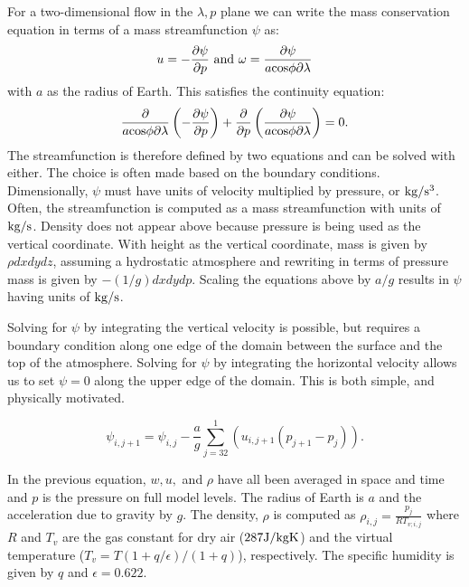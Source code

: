 \documentclass[draft]{agujournal2019}
\begin{document}
For a two-dimensional flow in the $\lambda,p$ plane we can write the mass conservation equation in terms of a 
mass streamfunction $\psi$ as: 
\begin{equation}
u =  -\frac{\partial \psi}{\partial p}   \,\, {\rm and} \,\, \omega =\frac{\partial \psi}{a \rm{cos} \phi \partial \lambda}
\end{equation}
with $a$ as the radius of Earth.
This satisfies the continuity equation: 
\begin{equation}
\frac{\partial}{a \rm{cos} \phi\partial\lambda}\left(-\frac{\partial \psi}{\partial p}\right)+\frac{\partial}{\partial p}\left(\frac{\partial \psi}{a \rm{cos}\phi \partial \lambda}\right)=0.
\end{equation}
The streamfunction is therefore defined by two equations and can be solved with either.  The choice is often made based on the 
boundary conditions.  Dimensionally, $\psi$ must have units of velocity multiplied by pressure, or $\rm{kg/s^3}$.  Often, the streamfunction
is computed as a mass streamfunction with units of $\rm{kg/s}$.  Density does not appear above
because pressure is being used as the vertical coordinate.   With height as the vertical coordinate, mass is given by $\rho dxdydz$, 
assuming a hydrostatic atmosphere and rewriting in terms of pressure mass is given by $-(1/g) dxdydp$.
Scaling the equations above by $a/g$ results in $\psi$ having units of $\rm{kg/s}$.  

Solving for $\psi$ by integrating the vertical velocity is possible, but requires a boundary condition along one edge of the domain between the surface and the 
top of the atmosphere.  Solving for $\psi$ by integrating the horizontal velocity allows us to set $\psi=0$ along the upper edge of the domain.  
This is both simple, and physically motivated.  

\begin{equation}
\psi_{i,j+1}= \psi_{i,j}-\frac{a}{g}\sum_{j=32}^1 \left(u_{i,j+1}(p_{j+1}-p_{j})\right).
\end{equation}

In the previous equation, $w, u,$ and $\rho$ have all been averaged in space and time and $p$ is the pressure on full model levels.  The 
radius of Earth is $a$ and the acceleration due to gravity by $g$.  The density, $\rho$ is computed as $ \rho_{i,j}=\frac{p_j}{R T_{v;i,j}}  $  where $R$ and $T_v$ are the gas constant for dry air ($287 \rm{J/kg K}$) and the virtual temperature ($T_v=T(1+q/\epsilon)/(1+q)$), respectively.  The specific humidity is given by $q$ and $\epsilon = 0.622$.
\end{document}

